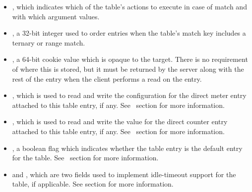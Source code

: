 \documentclass[11pt]{article}
\begin{document}
{\begin{itemize}
\item{}
, which indicates which of the table's actions to execute in case of
match and with which argument values.%

\item{}
, a 32-bit integer used to order entries when the table's match key
includes a ternary or range match.%

\item{}
, a 64-bit cookie value which is opaque to the
target. There is no requirement of where this is stored, but it must be
returned by the server along with the rest of the entry when the client
performs a read on the entry.%

\item{}
, which is used to read and write the configuration for the
direct meter entry attached to this table entry, if any. See~ section for more information.%

\item{}
, which is used to read and write the value for the direct
counter entry attached to this table entry, if any. See~ section for more information.%

\item{}
, a boolean flag which indicates whether the table entry is
the default entry for the table. See~
section for more information.%

\item{}
 and , which are two fields used to
implement idle-timeout support for the table, if applicable. See
 section for more information.%
\end{itemize}%

}
\end{document}
